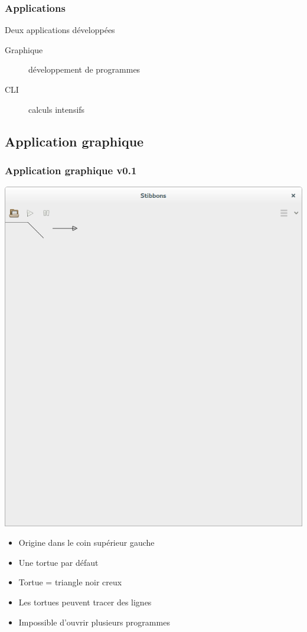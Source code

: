\begin{frame}
\frametitle{Applications}
Deux applications développées
\begin{description}
	\item [Graphique] développement de programmes
	\item [CLI] calculs intensifs
\end{description}
\end{frame}

\subsection{Application graphique}

\begin{frame}
\frametitle{Application graphique v0.1}
\begin{center}
\includegraphics[scale=0.16]{doc/report/screenshot/stibbons-0-1-2.png}
\end{center}

\begin{itemize}
	\item Origine dans le coin supérieur gauche
	\item Une tortue par défaut
	\item Tortue = triangle noir creux
	\item Les tortues peuvent tracer des lignes
	\item Impossible d'ouvrir plusieurs programmes
\end{itemize}
\end{frame}

